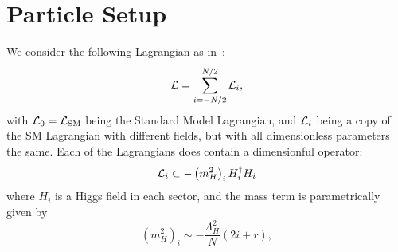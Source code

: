 \documentclass[nofootinbib,twocolumn,preprintnumbers]{revtex4-1}
\begin{document}
\section{Particle Setup}
\label{sec:nn}
We consider the following Lagrangian as in~\cite{Arkani-Hamed:2016rle}:
\begin{equation}
{\cal L} = \sum_{i=-N/2}^{N/2} {\cal L}_i,
\end{equation}
with ${\cal L}_0 = {\cal L}_{\rm SM}$ being the Standard Model Lagrangian, and ${\cal L}_i$ being a copy of the SM Lagrangian with different fields, but with all dimensionless parameters the same. Each of the Lagrangians does contain a dimensionful operator:
\begin{equation}
{\cal L}_i \subset  - \left(m_H^2\right)_i H_i^\dagger H_i  
\end{equation}
where $H_i$ is a Higgs field in each sector, and the mass term is parametrically given by
\begin{equation}\label{eqn:massParam}
\left(m_H^2\right)_i \sim -\frac{\Lambda_H^2}{N}(2i+r),
\end{equation}
\end{document}
